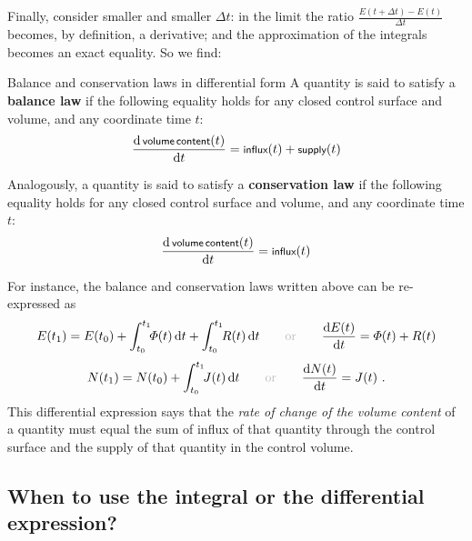 \documentclass[a4paper,12pt,%
onecolumn,oneside,%
british%
]{memoir}
\newcommand*{\di}{\mathrm{d}}%
\newcommand*{\incr}{\Delta}%
\renewcommand*{\|}[1][]{\nonscript\:#1\vert\nonscript\:\mathopen{}}
\newcommand*{\yti}{t_{0}}
\newcommand*{\ytf}{t_{1}}
\newcommand*{\Dt}{\incr t}
\newcommand*{\yN}{N}
\newcommand*{\yJ}{J}
\newcommand*{\yE}{E}
\newcommand*{\yH}{\varPhi}%
\newcommand*{\yR}{R}%
\begin{document}
Finally, consider smaller and smaller $\Dt$: in the limit the ratio \enskip$\frac{\yE(t+\Dt)-\yE(t)}{\Dt}$\enskip becomes, by definition, a derivative; and the approximation of the integrals becomes an exact equality. So we find:
\begin{definition}{Balance and conservation laws in differential form}
  A quantity is said to satisfy a \textbf{balance law} if the following equality holds for any closed control surface and volume, and any coordinate time $t$:
  \begin{equation}
    \label{eq:balanced_diff}
    \frac{\di\,\textsf{\footnotesize volume\,content}(t)}{\di t} =
    \textsf{\footnotesize influx}(t) +
    \textsf{\footnotesize supply}(t)
  \end{equation}

  \smallskip

  Analogously, a quantity is said to satisfy a \textbf{conservation law} if the following equality holds for any closed control surface and volume, and any coordinate time $t$:
  \begin{equation}
    \label{eq:conserved_diff}
    \frac{\di\,\textsf{\footnotesize volume\,content}(t)}{\di t} =
    \textsf{\footnotesize influx}(t)
  \end{equation}
\end{definition}
For instance, the balance and conservation laws written above can be re-expressed as
  \begin{equation*}
    \begin{gathered}
  \yE(\ytf) = \yE(\yti)
  + \int_{\yti}^{\ytf}\!\!\yH(t)\, \di t
  + \int_{\yti}^{\ytf}\!\!\yR(t)\,\di t
  \qquad\text{\color{grey}or}\qquad
      \frac{\di\yE(t)}{\di t} = \yH(t) + \yR(t)
      \\[\jot]
      \yN(\ytf) = \yN(\yti) + \int_{\yti}^{\ytf}\!\!\yJ(t)\, \di t
  \qquad\text{\color{grey}or}\qquad
    \frac{\di\yN(t)}{\di t} = \yJ(t) \ .
    \end{gathered}
  \end{equation*}
This differential expression says that the \emph{rate of change of the volume content} of a quantity must equal the sum of influx of that quantity through the control surface and the supply of that quantity in the control volume.

\subsection{When to use the integral or the differential expression?}
\label{sec:when_int_diff}
\end{document}
